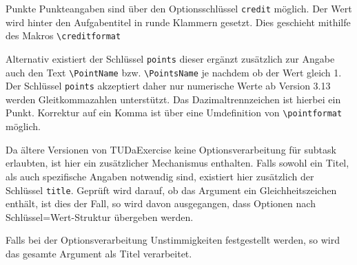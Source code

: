 \documentclass[
	ngerman,
	points=true,%
	]{tudaexercise}
\let\code\texttt
\let\tbs\textbackslash
\begin{document}
\begin{task}[credit=10]{Punkte}
Punkteangaben sind über den Optionsschlüssel \code{credit} möglich. Der Wert wird hinter den Aufgabentitel in runde Klammern gesetzt. Dies geschieht mithilfe des Makros \code{\tbs{}creditformat}

Alternativ existiert der Schlüssel \code{points} dieser ergänzt zusätzlich zur Angabe auch den Text \code{\tbs{}PointName} bzw. \code{\tbs{PointsName}} je nachdem ob der Wert gleich 1. Der Schlüssel \code{points} akzeptiert daher nur numerische Werte ab Version 3.13 werden Gleitkommazahlen unterstützt. Das Dazimaltrennzeichen ist hierbei ein Punkt. Korrektur auf ein Komma ist über eine Umdefinition von \code{\tbs{}pointformat} möglich.

\begin{subtask}[points=1,title=Beispiel für den Schlüssel points]
Da ältere Versionen von TUDaExercise keine Optionsverarbeitung für subtask erlaubten, ist hier ein zusätzlicher Mechanismus enthalten. Falls sowohl ein Titel, als auch spezifische Angaben notwendig sind, existiert hier zusätzlich der Schlüssel \code{title}.
Geprüft wird darauf, ob das Argument ein Gleichheitszeichen enthält, ist dies der Fall, so wird davon ausgegangen, dass Optionen nach Schlüssel=Wert-Struktur übergeben werden.
\end{subtask}

\begin{subtask}[Fallback-Modus, falls ein = im Titel detektiert wird, aber keine Zuweisung möglich ist.]
Falls bei der Optionsverarbeitung Unstimmigkeiten festgestellt werden, so wird das gesamte Argument als Titel verarbeitet.
\end{subtask}
\end{task}
\end{document}
